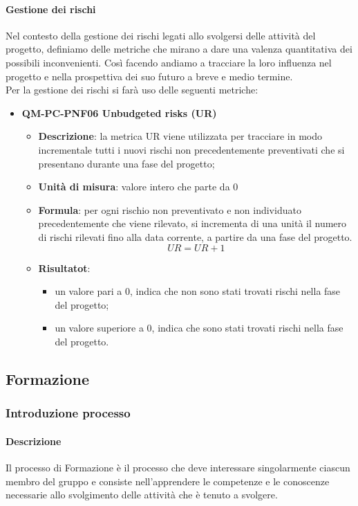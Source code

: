 			\paragraph{Gestione dei rischi}
				Nel contesto della gestione dei rischi legati allo svolgersi delle attività del progetto, definiamo delle metriche che mirano a dare una valenza quantitativa dei possibili inconvenienti. Così facendo andiamo a tracciare la loro influenza nel progetto e nella prospettiva dei suo futuro a breve e medio termine.\\
				Per la gestione dei rischi si farà uso delle seguenti metriche:
				\begin{itemize}
					\item\textbf{QM-PC-PNF06 Unbudgeted risks (UR)}
						\begin{itemize}
							\item\textbf{Descrizione}: la metrica UR viene utilizzata per tracciare in modo incrementale tutti i nuovi rischi non precedentemente preventivati che si presentano durante una fase del progetto;
							\item\textbf{Unità di misura}: valore intero che parte da 0
							\item\textbf{Formula}: per ogni rischio non preventivato e non individuato precedentemente che viene rilevato, si incrementa di una unità il numero di rischi rilevati fino alla data corrente, a partire da una fase del progetto.
								\[UR = UR + 1 \]
							\item\textbf{Risultatot}:
								\begin{itemize}
									\item un valore pari a 0, indica che non sono stati trovati rischi nella fase del progetto;
									\item un valore superiore a 0, indica che sono stati trovati rischi nella fase del progetto.
								\end{itemize}
						\end{itemize}
				\end{itemize}
	\subsection{Formazione}
		\subsubsection{Introduzione processo}
			\paragraph{Descrizione}
				Il processo di Formazione è il processo che deve interessare singolarmente ciascun membro del gruppo e consiste nell’apprendere le competenze e le conoscenze necessarie allo svolgimento delle attività che è tenuto a svolgere.
